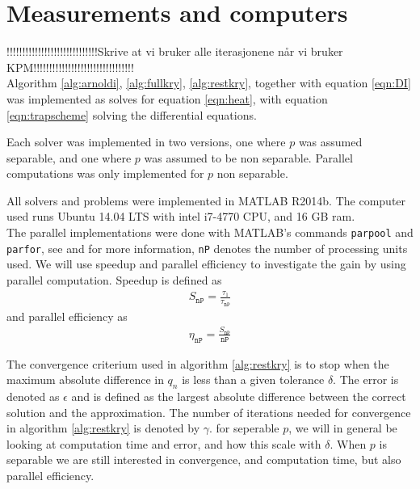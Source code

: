 \section{Measurements and computers} \label{sec:not}
!!!!!!!!!!!!!!!!!!!!!!!!!!!!!Skrive at vi bruker alle iterasjonene når vi bruker KPM!!!!!!!!!!!!!!!!!!!!!!!!!!!!!!!!\\
Algorithm \ref{alg:arnoldi}, \ref{alg:fullkry}, \ref{alg:restkry}, together with equation \ref{eqn:DI} was implemented as solves for equation \ref{eqn:heat}, with equation \ref{eqn:trapscheme} solving the differential equations. 

Each solver was implemented in two versions, one where $p$ was assumed separable, and one where $p$ was assumed to be non separable. Parallel computations was only implemented for $p$ non separable.

All solvers and problems were implemented in MATLAB R2014b. The computer used runs Ubuntu 14.04 LTS with intel  i7-4770 CPU, and 16 GB ram. \\

The parallel implementations were done with MATLAB's commands \texttt{parpool} and \texttt{parfor}, see \cite{parpool} and \cite{parfor} for more information, \texttt{nP} denotes the number of processing units used. We will use speedup and parallel efficiency to investigate the gain by using parallel computation. Speedup is defined as
\begin{align*}
S_\texttt{nP} = \frac{\tau_1}{\tau_\texttt{nP}}
\end{align*}
and parallel efficiency as
\begin{align*}
\eta_\texttt{nP} = \frac{S_\texttt{nP}}{\texttt{nP}}
\end{align*}


The convergence criterium used in algorithm \ref{alg:restkry} is to stop when the maximum absolute difference in $q_n$ is less than a given tolerance $\delta$. The error is denoted as $\epsilon$ and is defined as the largest absolute difference between the correct solution and the approximation. 
The number of iterations needed for convergence in algorithm \ref{alg:restkry} is denoted by $\gamma$. 
 for seperable $p$, we will in general be looking at computation time and error, and how this scale with $\delta$. When $p$ is separable we are still interested in convergence, and computation time, but also parallel efficiency. \\

